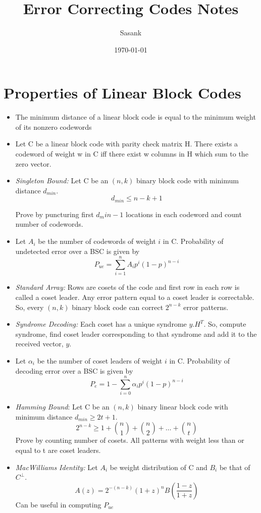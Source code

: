 \documentclass[a4paper]{article}
\theoremstyle{dotless}
\theoremstyle{dotless}
\theoremstyle{remark}
\begin{document}
\title{Error Correcting Codes Notes}
\author{Sasank}
\date{\today}
\maketitle


\section{Properties of Linear Block Codes}

\begin{itemize}
\item The minimum distance of a linear block code is equal to the
minimum weight of its nonzero codewords

\item Let C be a linear block code with parity check matrix H. There exists a codeword of weight w in C iff there exist w columns in H which sum to the zero vector.
 
\item \emph{Singleton Bound:} Let C be an $(n, k )$ binary block code with minimum distance
$d_{min}$.$$d_{min} \leq n - k + 1$$

Prove by puncturing first $d_min-1$ locations in each codeword and count number of codewords.

\item Let $A_i$ be the number of codewords of weight $i$ in C. Probability of undetected error over a BSC is given by $$P_{ue} = \sum_{i=1}^n A_ip^i(1-p)^{n-i}$$

\item \emph{Standard Array:} Rows are cosets of the code and first row in each row is called a coset leader. Any error pattern equal to a coset leader is correctable. So, every $(n,k)$ binary block code can correct $2^{n-k}$ error patterns.

\item \emph{Syndrome Decoding:} Each coset has a unique syndrome $y.H^T$. So, compute syndrome, find coset leader corresponding to that syndrome and add it to the received vector, $y$. 

\item Let $\alpha_i$ be the number of coset leaders of weight $i$ in C. Probability of decoding error over a BSC is given by $$P_e = 1- \sum_{i=0}^n\alpha_i p^i(1-p)^{n-i}$$

\item \emph{Hamming Bound}: Let C be an $(n, k )$ binary linear block code with minimum distance $d_{min} \geq 2t + 1$.
$$2^{n-k}\geq 1 + {n\choose 1}+{n\choose 2}+\dots+{n\choose t} $$
Prove by counting number of cosets. All patterns with weight less than or equal to t are coset leaders.

\item \emph{MacWilliams Identity:} Let $A_i$ be weight distribution of C and $B_i$ be that of $C^\perp$.
$$A(z) = 2^{-(n-k)}(1+z)^n B\left( \frac{1-z}{1+z}\right)$$
Can be useful in computing $P_{ue}$

\end{itemize}
\end{document}
